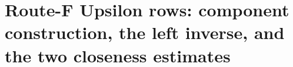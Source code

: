 \section{Route-F Upsilon rows: component construction, the left inverse, and the two closeness estimates}\label{sec:routef-upsilon}

